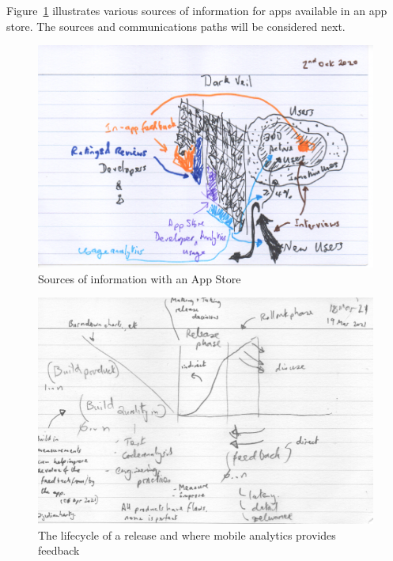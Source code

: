 Figure~\ref{fig:sources-of-info-with-app-store-background-ch} illustrates various sources of information for apps available in an app store. The sources and communications paths will be considered next. 

\begin{figure}
    \includegraphics[width=\linewidth]{images/rough-sketches/sources-of-information-with-app-store-1.pdf}
    \caption{Sources of information with an App Store}
    \label{fig:sources-of-info-with-app-store-background-ch}
\end{figure}

\begin{figure}
    \includegraphics[width=\linewidth]{images/rough-sketches/Red-Thread-Rough-Sketch.jpeg}
    \caption{The lifecycle of a release and where mobile analytics provides feedback}
    \label{fig:red-thread-for-this-thesis}
\end{figure}

